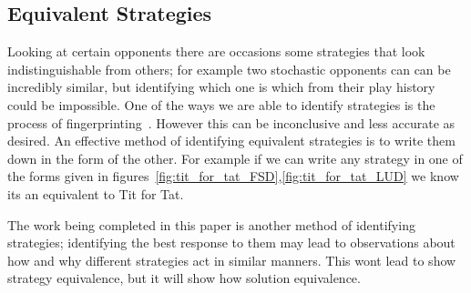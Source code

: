 \subsection{Equivalent Strategies}\label{subsec:equivalentStrategies}
Looking at certain opponents there are occasions some strategies that look indistinguishable from others;
for example two stochastic opponents can can be incredibly similar, but identifying which one is which from their play history could be impossible.
One of the ways we are able to identify strategies is the process of fingerprinting~\cite{Ashlock2004,Ashlock2008,cambell2016thesis}.
However this can be inconclusive and less accurate as desired.
An effective method of identifying equivalent strategies is to write them down in the form of the other.
For example if we can write any strategy in one of the forms given in figures~\ref{fig:tit_for_tat_FSD},\ref{fig:tit_for_tat_LUD} we know its an equivalent to Tit for Tat.

The work being completed in this paper is another method of identifying strategies; identifying the best response to them may lead to observations about how and why different strategies act in similar manners.
This wont lead to show strategy equivalence, but it will show how solution equivalence.

